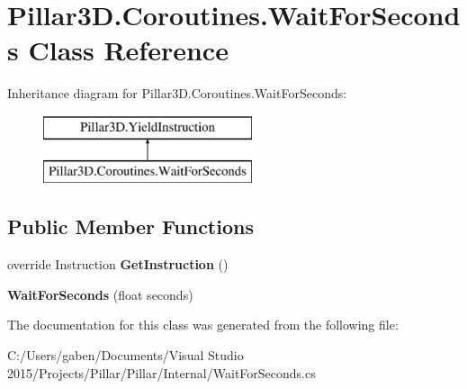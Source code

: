 \hypertarget{class_pillar3_d_1_1_coroutines_1_1_wait_for_seconds}{}\section{Pillar3\+D.\+Coroutines.\+Wait\+For\+Seconds Class Reference}
\label{class_pillar3_d_1_1_coroutines_1_1_wait_for_seconds}
Inheritance diagram for Pillar3\+D.\+Coroutines.\+Wait\+For\+Seconds\+:\begin{figure}[H]
\begin{center}
\leavevmode
\includegraphics[height=2.000000cm]{class_pillar3_d_1_1_coroutines_1_1_wait_for_seconds}
\end{center}
\end{figure}
\subsection*{Public Member Functions}
\begin{DoxyCompactItemize}
\item 
\mbox{\label{class_pillar3_d_1_1_coroutines_1_1_wait_for_seconds_afba40c0c85d2e8ca1810bdee7222a61e}} 
override Instruction {\bfseries Get\+Instruction} ()
\item 
\mbox{\label{class_pillar3_d_1_1_coroutines_1_1_wait_for_seconds_aca45ff32389c27ffed6a998952fab58d}} 
{\bfseries Wait\+For\+Seconds} (float seconds)
\end{DoxyCompactItemize}


The documentation for this class was generated from the following file\+:\begin{DoxyCompactItemize}
\item 
C\+:/\+Users/gaben/\+Documents/\+Visual Studio 2015/\+Projects/\+Pillar/\+Pillar/\+Internal/Wait\+For\+Seconds.\+cs\end{DoxyCompactItemize}
